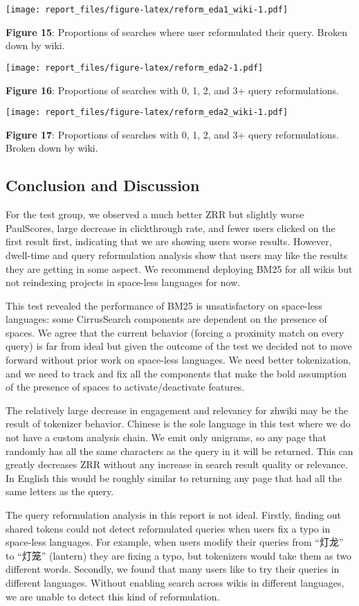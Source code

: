 \documentclass[12pt,]{article}
\begin{document}
\texttt{[image: report\_files/figure-latex/reform\_eda1\_wiki-1.pdf]}

\textbf{Figure 15}: Proportions of searches where user reformulated
their query. Broken down by wiki.

\texttt{[image: report\_files/figure-latex/reform\_eda2-1.pdf]}

\textbf{Figure 16}: Proportions of searches with 0, 1, 2, and 3+ query
reformulations.

\texttt{[image: report\_files/figure-latex/reform\_eda2\_wiki-1.pdf]}

\textbf{Figure 17}: Proportions of searches with 0, 1, 2, and 3+ query
reformulations. Broken down by wiki.

\subsection{Conclusion and Discussion}\label{conclusion-and-discussion}

For the test group, we observed a much better ZRR but slightly worse
PaulScores, large decrease in clickthrough rate, and fewer users clicked
on the first result first, indicating that we are showing users worse
results. However, dwell-time and query reformulation analysis show that
users may like the results they are getting in some aspect. We recommend
deploying BM25 for all wikis but not reindexing projects in space-less
languages for now.

This test revealed the performance of BM25 is unsatisfactory on
space-less languages: some CirrusSearch components are dependent on the
presence of spaces. We agree that the current behavior (forcing a
proximity match on every query) is far from ideal but given the outcome
of the test we decided not to move forward without prior work on
space-less languages. We need better tokenization, and we need to track
and fix all the components that make the bold assumption of the presence
of spaces to activate/deactivate features.

The relatively large decrease in engagement and relevancy for zhwiki may
be the result of tokenizer behavior. Chinese is the sole language in
this test where we do not have a custom analysis chain. We emit only
unigrams, so any page that randomly has all the same characters as the
query in it will be returned. This can greatly decreases ZRR without any
increase in search result quality or relevance. In English this would be
roughly similar to returning any page that had all the same letters as
the query.

The query reformulation analysis in this report is not ideal. Firstly,
finding out shared tokens could not detect reformulated queries when
users fix a typo in space-less languages. For example, when users modify
their queries from ``灯龙'' to ``灯笼'' (lantern) they are fixing a
typo, but tokenizers would take them as two different words. Secondly,
we found that many users like to try their queries in different
languages. Without enabling search across wikis in different languages,
we are unable to detect this kind of reformulation.
\end{document}
